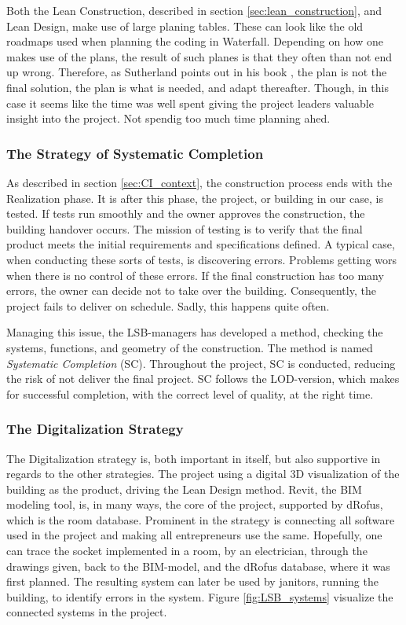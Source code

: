 Both the Lean Construction, described in section \ref{sec:lean_construction}, and Lean Design, make use of large planing tables. These can look like the old roadmaps used when planning the coding in Waterfall. Depending on how one makes use of the plans, the result of such planes is that they often than not end up wrong. Therefore, as Sutherland points out in his book \cite{sutherland}, the plan is not the final solution, the plan is what is needed, and adapt thereafter. Though, in this case it seems like the time was well spent giving the project leaders valuable insight into the project. Not spendig too much time planning ahed. 

\subsubsection*{The Strategy of Systematic Completion}
As described in section \ref{sec:CI_context}, the construction process ends with the Realization phase. It is after this phase, the project, or building in our case, is tested. If tests run smoothly and the owner approves the construction, the building handover occurs. The mission of testing is to verify that the final product meets the initial requirements and specifications defined. A typical case, when conducting these sorts of tests, is discovering errors. Problems getting wors when there is no control of these errors. If the final construction has too many errors, the owner can decide not to take over the building. Consequently, the project fails to deliver on schedule. Sadly, this happens quite often.

Managing this issue, the LSB-managers has developed a method, checking the systems, functions, and geometry of the construction. The method is named \textit{Systematic Completion} (SC). Throughout the project, SC is conducted, reducing the risk of not deliver the final project. SC follows the LOD-version, which makes for successful completion, with the correct level of quality, at the right time.

\subsubsection*{The Digitalization Strategy}
The Digitalization strategy is, both important in itself, but also supportive in regards to the other strategies. The project using a digital 3D visualization of the building as the product, driving the Lean Design method. Revit, the BIM modeling tool, is, in many ways, the core of the project, supported by dRofus, which is the room database. Prominent in the strategy is connecting all software used in the project and making all entrepreneurs use the same. Hopefully, one can trace the socket implemented in a room, by an electrician, through the drawings given, back to the BIM-model, and the dRofus database, where it was first planned. The resulting system can later be used by janitors, running the building, to identify errors in the system.  Figure \ref{fig:LSB_systems} visualize the connected systems in the project.

